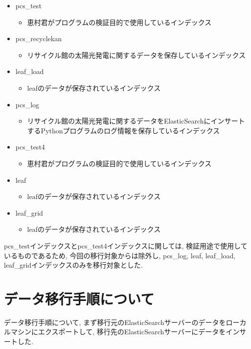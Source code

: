 \documentclass[a4j,12pt,]{jarticle}
\begin{document}
\begin{itemize}
  \item pcs\_test
  \begin{itemize}
    \item 恵村君がプログラムの検証目的で使用しているインデックス
  \end{itemize}
  \item pcs\_recyclekan
  \begin{itemize}
    \item リサイクル館の太陽光発電に関するデータを保存しているインデックス
  \end{itemize}
  \item leaf\_load
  \begin{itemize}
    \item leafのデータが保存されているインデックス
  \end{itemize}
  \item pcs\_log
  \begin{itemize}
    \item リサイクル館の太陽光発電に関するデータをElasticSearchにインサートするPythonプログラムのログ情報を保存しているインデックス
  \end{itemize}
  \item pcs\_test4
  \begin{itemize}
    \item 恵村君がプログラムの検証目的で使用しているインデックス
  \end{itemize}
  \item leaf
  \begin{itemize}
    \item leafのデータが保存されているインデックス
  \end{itemize}
  \item leaf\_grid
  \begin{itemize}
    \item leafのデータが保存されているインデックス
  \end{itemize}
\end{itemize}

pcs\_testインデックスとpcs\_test4インデックスに関しては, 検証用途で使用しているものであるため, 今回の移行対象からは除外し, pcs\_log, leaf, leaf\_load, leaf\_gridインデックスのみを移行対象とした.

\section{データ移行手順について}

データ移行手順について, まず移行元のElasticSearchサーバーのデータをローカルマシンにエクスポートして, 移行先のElasticSearchサーバーにデータをインサートした.
\end{document}
